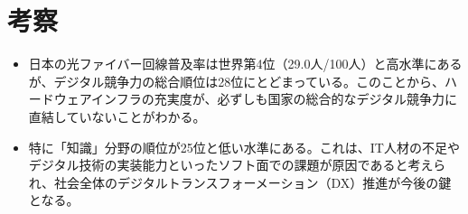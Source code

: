 \documentclass[a4j]{ujarticle}
\begin{document}
\section{考察}

\begin{itemize}
  \item 日本の光ファイバー回線普及率は世界第4位（29.0人/100人）と高水準にあるが、デジタル競争力の総合順位は28位にとどまっている。このことから、ハードウェアインフラの充実度が、必ずしも国家の総合的なデジタル競争力に直結していないことがわかる。
  \item 特に「知識」分野の順位が25位と低い水準にある。これは、IT人材の不足やデジタル技術の実装能力といったソフト面での課題が原因であると考えられ、社会全体のデジタルトランスフォーメーション（DX）推進が今後の鍵となる。
\end{itemize}



\end{document}
